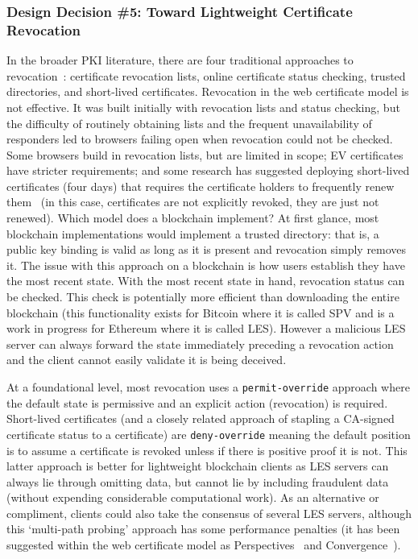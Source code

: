 
\subsubsection{Design Decision \#5: Toward Lightweight Certificate Revocation\\}

In the broader PKI literature, there are four traditional approaches to revocation~\cite{myers1998revocatoin}: certificate revocation lists, online certificate status checking, trusted directories, and short-lived certificates. Revocation in the web certificate model is not effective. It was built initially with revocation lists and status checking, but the difficulty of routinely obtaining lists and the frequent unavailability of responders led to browsers failing open when revocation could not be checked. Some browsers build in revocation lists, but are limited in scope; EV certificates have stricter requirements; and some research has suggested deploying short-lived certificates (\eg four days) that requires the certificate holders to frequently renew them~\cite{topalovic2012towards} (in this case, certificates are not explicitly revoked, they are just not renewed). Which model does a blockchain implement? At first glance, most blockchain implementations would implement a trusted directory: that is, a public key binding is valid as long as it is present and revocation simply removes it. The issue with this approach on a blockchain is how users establish they have the most recent state. With the most recent state in hand, revocation status can be checked. This check is potentially more efficient than downloading the entire blockchain (this functionality exists for Bitcoin where it is called SPV and is a work in progress for Ethereum where it is called LES). However a malicious LES server can always forward the state immediately preceding a revocation action and the client cannot easily validate it is being deceived.

At a foundational level, most revocation uses a \texttt{permit-override} approach where the default state is permissive and an explicit action (revocation) is required. Short-lived certificates (and a closely related approach of stapling a CA-signed certificate status to a certificate) are \texttt{deny-override} meaning the default position is to assume a certificate is revoked unless if there is positive proof it is not. This latter approach is better for lightweight blockchain clients as LES servers can always lie through omitting data, but cannot lie by including fraudulent data (without expending considerable computational work). As an alternative or compliment, clients could also take the consensus of several LES servers, although this `multi-path probing' approach has some performance penalties (it has been suggested within the web certificate model as Perspectives~\cite{WAP08} and Convergence~\cite{Mar11}). 

